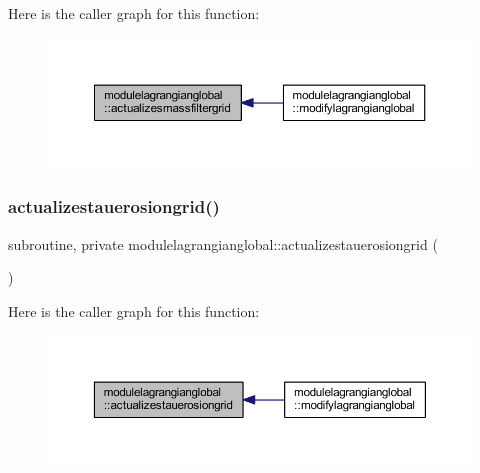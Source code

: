 Here is the caller graph for this function\+:\nopagebreak
\begin{figure}[H]
\begin{center}
\leavevmode
\includegraphics[width=350pt]{namespacemodulelagrangianglobal_a9f884711ce254712333517d3851888e9_icgraph}
\end{center}
\end{figure}
\mbox{\label{namespacemodulelagrangianglobal_a1ed2a4fd6026ab2cae60ca5e59d48c5c}} 
\subsubsection{\texorpdfstring{actualizestauerosiongrid()}{actualizestauerosiongrid()}}
{\footnotesize\ttfamily subroutine, private modulelagrangianglobal\+::actualizestauerosiongrid (\begin{DoxyParamCaption}{ }\end{DoxyParamCaption})\hspace{0.3cm}{\ttfamily [private]}}

Here is the caller graph for this function\+:\nopagebreak
\begin{figure}[H]
\begin{center}
\leavevmode
\includegraphics[width=350pt]{namespacemodulelagrangianglobal_a1ed2a4fd6026ab2cae60ca5e59d48c5c_icgraph}
\end{center}
\end{figure}
\mbox{\label{namespacemodulelagrangianglobal_a56f5f58e1be0e429b3e792cfd510ddb0}} 
